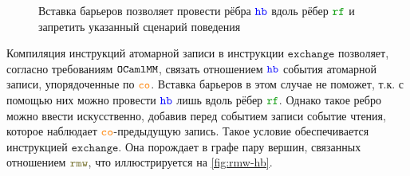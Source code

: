 \newcommand{\offsetfive}{3}
\begin{figure}[h]
  \centering
  \begin{minipage}{0.9\textwidth}
    \centering
  \end{minipage}
  \caption{Вставка барьеров позволяет провести рёбра $\lHB$ вдоль рёбер $\lRF$ и запретить указанный сценарий поведения}
  \label{fig:fences-hb}
\end{figure}


Компиляция инструкций атомарной записи в инструкции $\mathtt{exchange}$ позволяет, согласно требованиям $\mathtt{OCaml}\allowbreak \mathtt{MM}$, связать отношением $\lHB$ события атомарной записи, упорядоченные по $\lCO$. Вставка барьеров в этом случае не поможет, т.к. с помощью них можно провести $\lHB$ лишь вдоль рёбер $\lRF$. Однако такое ребро можно ввести искусственно, добавив перед событием записи событие чтения, которое наблюдает $\lCO$-предыдущую запись. Такое условие обеспечивается инструкцией $\mathtt{exchange}$. Она порождает в графе пару вершин, связанных отношением $\lRMW$, что иллюстрируется на \cref{fig:rmw-hb}.

